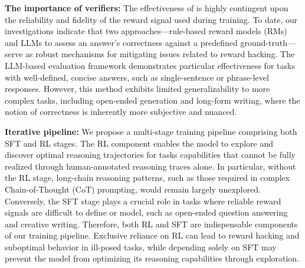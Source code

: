 \textbf{The importance of verifiers: }The effectiveness of \dsro{} is highly contingent upon the reliability and fidelity of the reward signal used during training. To date, our investigations indicate that two approaches—rule-based reward models (RMs) and LLMs to assess an answer’s correctness against a predefined ground-truth—serve as robust mechanisms for mitigating issues related to reward hacking. The LLM-based evaluation framework demonstrates particular effectiveness for tasks with well-defined, concise answers, such as single-sentence or phrase-level responses. However, this method exhibits limited generalizability to more complex tasks, including open-ended generation and long-form writing, where the notion of correctness is inherently more subjective and nuanced.

\textbf{Iterative pipeline:}  We propose a multi-stage training pipeline comprising both SFT and RL stages. The RL component enables the model to explore and discover optimal reasoning trajectories for  tasks capabilities that cannot be fully realized through human-annotated reasoning traces alone. In particular, without the RL stage, long-chain reasoning patterns, such as those required in complex Chain-of-Thought (CoT) prompting, would remain largely unexplored. Conversely, the SFT stage plays a crucial role in tasks where reliable reward signals are difficult to define or model, such as open-ended question answering and creative writing. Therefore, both RL and SFT are indispensable components of our training pipeline. Exclusive reliance on RL can lead to reward hacking and suboptimal behavior in ill-posed tasks, while depending solely on SFT may prevent the model from optimizing its reasoning capabilities through exploration.





